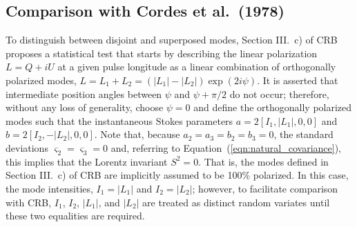 \documentclass[twocolumn]{aastex6}
\newcommand{\mbf}[1]{\mbox{\boldmath $#1$}}
\newcommand{\Eqn}[1]{Equation~(\ref{eqn:#1})}
\newcommand{\exterior}[2]{\ensuremath{{#1}\wedge{#2}}}
\begin{document}
{\begin{appendix}




\section{Comparison with Cordes et al.\ (1978)}
\label{app:comparison_with_crb78}

To distinguish between disjoint and superposed modes, Section III.~c)
of CRB proposes a statistical test that starts by describing the
linear polarization $L=Q+iU$ at a given pulse longitude as a linear
combination of orthogonally polarized modes,
$L=L_1+L_2=\left(|L_1|-|L_2|\right)\exp(2i\psi)$.
%
It is asserted that intermediate position angles between $\psi$ and
$\psi+\pi/2$ do not occur; therefore, without any loss of generality,
choose $\psi=0$ and define the orthogonally polarized modes such that
the instantaneous Stokes parameters $a=2\left[I_1,|L_1|,0,0\right]$
and $b=2\left[I_2,-|L_2|,0,0\right]$.
%
Note that, because $a_2=a_3=b_2=b_3=0$, the standard deviations
$\varsigma_2=\varsigma_3=0$ and, referring to \Eqn{natural_covariance},
this implies that the Lorentz invariant $S^2=0$.
%
That is, the modes defined in Section III.~c) of CRB are implicitly
assumed to be 100\% polarized.
%
In this case, the mode intensities, $I_1=|L_1|$ and $I_2=|L_2|$;
however, to facilitate comparison with CRB, $I_1$, $I_2$, $|L_1|$, and
$|L_2|$ are treated as distinct random variates until these two
equalities are required.



\end{appendix}}
\end{document}
